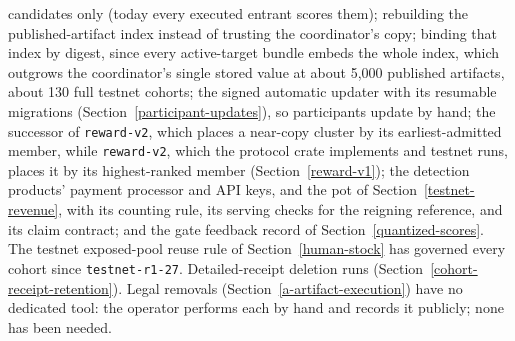 candidates only (today every executed entrant scores them); rebuilding the
published-artifact index instead of trusting the coordinator's copy; binding
that index by digest, since every active-target bundle embeds the whole index,
which outgrows the coordinator's single stored value at about 5,000 published
artifacts, about 130 full testnet cohorts; the signed automatic updater
with its resumable migrations (Section~\ref{participant-updates}), so
participants update by hand; the successor of
\texttt{reward-v2}, which places a near-copy cluster by its earliest-admitted
member, while \texttt{reward-v2}, which the protocol crate implements and
testnet runs, places it by its highest-ranked member
(Section~\ref{reward-v1}); the detection products' payment processor and API
keys, and the pot of Section~\ref{testnet-revenue}, with its counting rule, its
serving checks for the reigning reference, and its claim contract; and the gate
feedback record of Section~\ref{quantized-scores}. The testnet exposed-pool
reuse rule of Section~\ref{human-stock} has governed every cohort since
\texttt{testnet-r1-27}. Detailed-receipt deletion runs
(Section~\ref{cohort-receipt-retention}). Legal removals
(Section~\ref{a-artifact-execution}) have no dedicated tool: the operator
performs each by hand and records it publicly; none has been needed.

